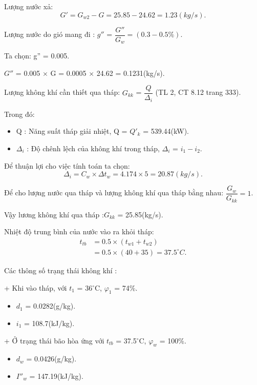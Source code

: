 Lượng nước xả:
\begin{equation*}
	G' = G_{w2} - G = 25.85 - 24.62 = 1.23(kg/s).
\end{equation*}

Lượng nước do gió mang đi : $g''$ = $\dfrac{G''}{G_{w}} = (0.3 - 0.5\%)$.

Ta chọn: g'' = 0.005.

$G''$ = 0.005 $\times$ G = 0.0005 $\times$ 24.62 = 0.1231(kg/s).

Lượng không khí cần thiết qua tháp:
$G_{kk}$ = $\dfrac{Q}{\Delta_{i}}$ (TL 2, CT 8.12 trang 333).

Trong đó:

\begin{itemize}[label = +]
	\item Q : Năng suất tháp giải nhiệt, Q = $Q'_{k}$ = 539.44(kW).

	\item  $\Delta_{i}$ : Độ chênh lệch của không khí trong tháp, $\Delta_{i}$ = $i_{1} - i_{2}$.  
\end{itemize}

Để thuận lợi cho việc tính toán ta chọn:
\begin{equation*}
	\Delta_{i} = C_{w} \times \Delta t_{w} = 4.174 \times 5 = 20.87(kg/s).
\end{equation*}

Để cho lượng nước qua tháp và lượng không khí qua tháp bằng nhau: $\dfrac{G_{w}}{G_{kk}} = 1$.

Vậy lương không khí qua tháp :$G_{kk}$ = 25.85(kg/s).

Nhiệt độ trung bình của nước vào ra khỏi tháp:
\begin{equation*}
	\begin{split}
		t_{tb}& = 0.5 \times (t_{w1} + t_{w2})\\ 
		      & = 0.5 \times (40 + 35) = 37.5^{\circ}C.
	\end{split}
\end{equation*}

Các thông số trạng thái không khí :

+ Khi vào tháp, với $t_{1}$ = 36$^{\circ}$C, $\varphi_{1}$ = 74\%.
\begin{itemize}
	\item $d_{1}$ = 0.0282(g/kg).
	\item $i_{1}$ = 108.7(kJ/kg).
\end{itemize}

+ Ở trạng thái bão hòa ứng với $t_{tb}$ = 37.5$^{\circ}$C, $\varphi_{w}$ = 100\%.
\begin{itemize}
	\item $d_{w}$ = 0.0426(g/kg).
	\item $I''_{w}$ = 147.19(kJ/kg).
\end{itemize}

